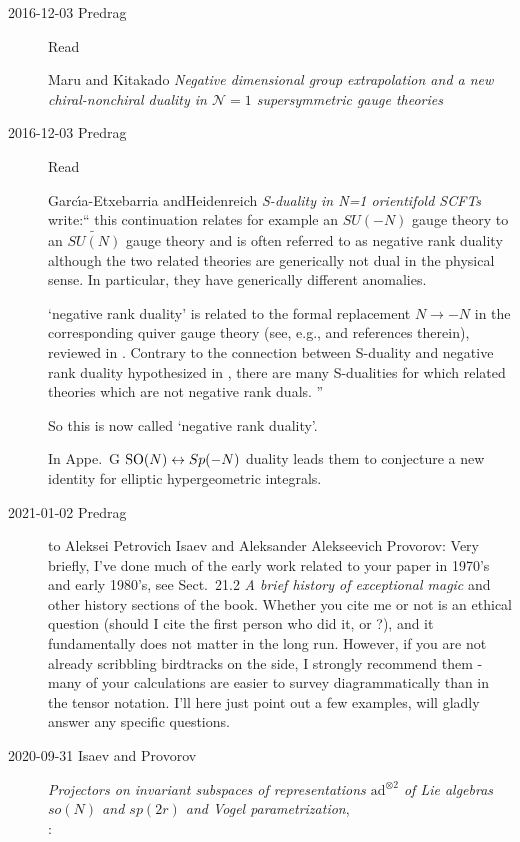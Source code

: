 \begin{description}
\item[2016-12-03 Predrag]
Read

Maru and Kitakado
{\em Negative dimensional group extrapolation and a new chiral-nonchiral
duality in ${\mathcal N} = 1$ supersymmetric gauge theories}

\item[2016-12-03 Predrag]
Read

Garc{\'{\i}}a-Etxebarria andHeidenreich
{\em S-duality in N=1 orientifold {SCFTs}} write:``
this continuation relates for example an $SU(-N)$ gauge theory to an
$\tilde{SU(N)}$ gauge theory and is often referred to as negative rank duality
although the two related theories are generically not dual in the physical
sense. In particular, they have generically different anomalies.

`negative rank duality' is related to the formal replacement $N \to -N$ in the
corresponding quiver gauge theory (see, e.g.,  and references
therein), reviewed in . Contrary to the connection between
S-duality and negative rank duality hypothesized in ,
there are many S-dualities for which related theories which are not negative
rank duals.
''

So this is now called `negative rank duality'.

In Appe.~G $\textrm{SO}(N) \leftrightarrow Sp(-N)$ duality leads them to conjecture
a new identity for elliptic hypergeometric integrals.

\newpage %
\item[2021-01-02 Predrag] to
{Aleksei Petrovich Isaev} and
Aleksander Alekseevich Provorov:
 Very briefly, I've done much of the early work related to
your paper in 1970's and early 1980's, see 
{Sect.~21.2} {\em A brief history of exceptional magic} and other
history sections of the book. Whether you cite me or not is an
ethical question (should I cite
{the first person who did it}, or ?),
and it fundamentally does not matter in the long run.
However, if you are not already scribbling birdtracks on the side, I
strongly recommend them - many of your calculations are easier to survey
diagrammatically than in the tensor notation. I'll here just point out a
few examples, will gladly answer any specific questions.

\item[2020-09-31 Isaev and Provorov]
{\em Projectors on invariant subspaces of representations
{$\mathrm{ad}^{\otimes 2}$} of {Lie} algebras ${so(N)}$ and {$sp(2r)$}
and {Vogel} parametrization},\\
:


\end{description}
